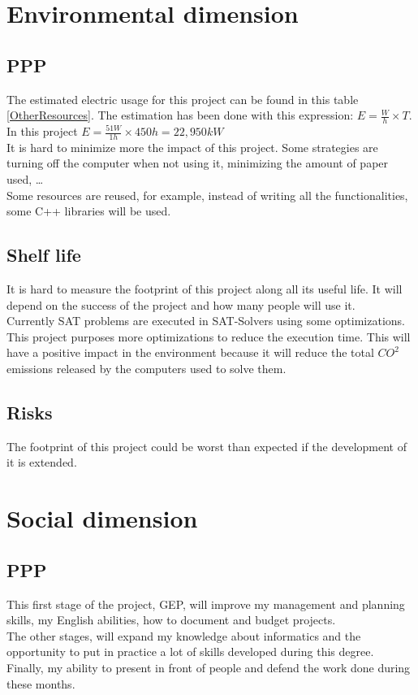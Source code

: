 \section{Environmental dimension }
\subsection{PPP}
The estimated electric usage for this project can be found in this table \ref{OtherResources}. The estimation has been done with this expression: $E=\frac{W}{h} \times T$. In this project $E=\frac{51W}{1h}\times 450h = 22,950kW$\\

It is hard to minimize more the impact of this project. Some strategies are turning off the computer when not using it, minimizing the amount of paper used, \ldots\\
Some resources are reused, for example, instead of writing all the functionalities, some C++ libraries will be used.
\subsection{Shelf life}
It is hard to measure the footprint of this project along all its useful life. It will depend on the success of the project and how many people will use it. \\

Currently SAT problems are executed in SAT-Solvers using some optimizations. This project purposes more optimizations to reduce the execution time. This will have a positive impact in the environment because it will reduce the total $CO^2$ emissions released by the computers used to solve them.
\subsection{Risks} 
The footprint of this project could be worst than expected if the development of it is extended.

\section{Social dimension}
\subsection{PPP}
This first stage of the project, GEP, will improve my management and planning skills, my English abilities, how to document and budget projects.\\
The other stages, will expand my knowledge about informatics and the opportunity to put in practice a lot of skills developed during this degree. \\
Finally, my ability to present in front of people and defend the work done during these months.

